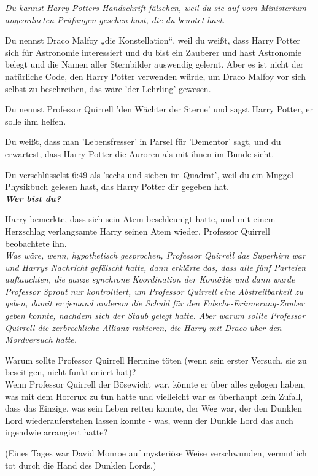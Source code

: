 {\emph{Du kannst Harry Potters Handschrift fälschen, weil du sie auf vom Ministerium angeordneten Prüfungen gesehen hast, die du benotet hast.}

Du nennst Draco Malfoy „die Konstellation“, weil du weißt, dass Harry Potter sich für Astronomie interessiert und du bist ein Zauberer und hast Astronomie belegt und die Namen aller Sternbilder auswendig gelernt. Aber es ist nicht der natürliche Code, den Harry Potter verwenden würde, um Draco Malfoy vor sich selbst zu beschreiben, das wäre 'der Lehrling' gewesen.

Du nennst Professor Quirrell 'den Wächter der Sterne' und sagst Harry Potter, er solle ihm helfen.

Du weißt, dass man 'Lebensfresser' in Parsel für 'Dementor' sagt, und du erwartest, dass Harry Potter die Auroren als mit ihnen im Bunde sieht.

Du verschlüsselst 6:49 als 'sechs und sieben im Quadrat', weil du ein Muggel-Physikbuch gelesen hast, das Harry Potter dir gegeben hat.\\

\hfill\break \textbf{\emph{Wer bist du?}}

Harry bemerkte, dass sich sein Atem beschleunigt hatte, und mit einem Herzschlag verlangsamte Harry seinen Atem wieder, Professor Quirrell beobachtete ihn.\\ \emph{\hfill\break Was wäre, wenn, hypothetisch gesprochen, Professor Quirrell das Superhirn war und Harrys Nachricht gefälscht hatte, dann erklärte das, dass alle fünf Parteien auftauchten, die ganze synchrone Koordination der Komödie und dann wurde Professor Sprout nur kontrolliert, um Professor Quirrell eine Abstreitbarkeit zu geben, damit er jemand anderem die Schuld für den Falsche-Erinnerung-Zauber geben konnte, nachdem sich der Staub gelegt hatte. Aber warum sollte Professor Quirrell die zerbrechliche Allianz riskieren, die Harry mit Draco über den Mordversuch hatte.}

Warum sollte Professor Quirrell Hermine töten (wenn sein erster Versuch, sie zu beseitigen, nicht funktioniert hat)?\\ Wenn Professor Quirrell der Bösewicht war, könnte er über alles gelogen haben, was mit dem Horcrux zu tun hatte und vielleicht war es überhaupt kein Zufall, dass das Einzige, was sein Leben retten konnte, der Weg war, der den Dunklen Lord wiederauferstehen lassen konnte - was, wenn der Dunkle Lord das auch irgendwie arrangiert hatte?

(Eines Tages war David Monroe auf mysteriöse Weise verschwunden, vermutlich tot durch die Hand des Dunklen Lords.)

}
